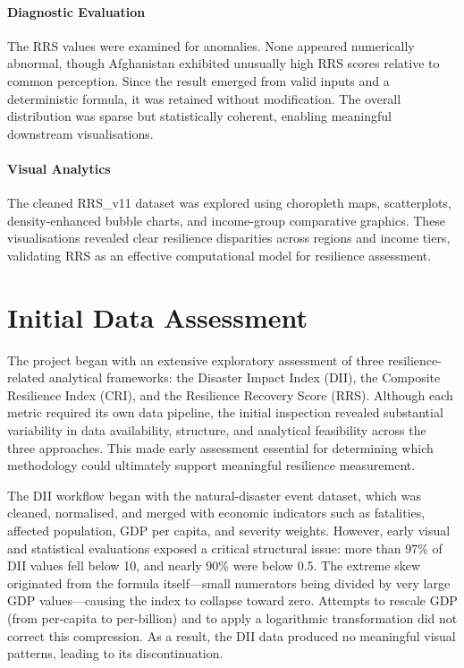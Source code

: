\documentclass[conference]{IEEEtran}
\begin{document}
\paragraph{Diagnostic Evaluation}

The RRS values were examined for anomalies. None appeared numerically abnormal, though Afghanistan exhibited unusually high RRS scores relative to common perception. Since the result emerged from valid inputs and a deterministic formula, it was retained without modification. The overall distribution was sparse but statistically coherent, enabling meaningful downstream visualisations.

\paragraph{Visual Analytics}

The cleaned RRS\_v11 dataset was explored using choropleth maps, scatterplots, density-enhanced bubble charts, and income-group comparative graphics. These visualisations revealed clear resilience disparities across regions and income tiers, validating RRS as an effective computational model for resilience assessment.

\section*{Initial Data Assessment}
The project began with an extensive exploratory assessment of three resilience-related analytical frameworks: the Disaster Impact Index (DII), the Composite Resilience Index (CRI), and the Resilience Recovery Score (RRS). Although each metric required its own data pipeline, the initial inspection revealed substantial variability in data availability, structure, and analytical feasibility across the three approaches. This made early assessment essential for determining which methodology could ultimately support meaningful resilience measurement.

The DII workflow began with the natural-disaster event dataset, which was cleaned, normalised, and merged with economic indicators such as fatalities, affected population, GDP per capita, and severity weights. However, early visual and statistical evaluations exposed a critical structural issue: more than 97\% of DII values fell below 10, and nearly 90\% were below 0.5. The extreme skew originated from the formula itself—small numerators being divided by very large GDP values—causing the index to collapse toward zero. Attempts to rescale GDP (from per-capita to per-billion) and to apply a logarithmic transformation did not correct this compression. As a result, the DII data produced no meaningful visual patterns, leading to its discontinuation.
\end{document}
